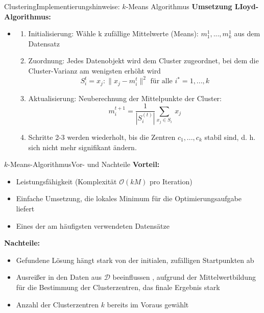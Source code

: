 \documentclass[169, handout	]{THIbeamer} %
\begin{document}
	\begin{frame}{Clustering}{Implementierungshinweise: $k$-Means Algorithmus}
		\textbf{Umsetzung LIoyd-Algorithmus:}
		\begin{itemize}
			\item 
			\begin{enumerate}
				\item Initialisierung: Wähle k zufällige Mittelwerte (Means): $m_1^{1},...,m_k^{1}$ aus dem Datensatz
				\item Zuordnung: Jedes Datenobjekt wird dem Cluster zugeordnet, bei dem die Cluster-Varianz am wenigsten erhöht wird
				\begin{equation}
					S_i^{t} = { x_j : \lVert x_j - m_i^{t} \rVert ^2 \text{ für alle } i^{*}=1, ..., k}
				\end{equation}
				\item Aktualisierung: Neuberechnung der Mittelpunkte der Cluster:
				\begin{equation}
					m_i^{t+1} = \frac{1}{|S_i^{(t)}|} \sum_{x_j \in S_i}^{}\ x_j
				\end{equation}
				\item Schritte 2-3 werden wiederholt, bis die Zentren $c_1, ..., c_k$ stabil sind, d. h. sich nicht mehr signifikant ändern.
			\end{enumerate}

		\end{itemize}
	\end{frame}
	\begin{frame}{$k$-Means-Algorithmus}{Vor- und Nachteile}
		\textbf{Vorteil:} 
		\begin{itemize}
			\item Leistungsfähigkeit (Komplexität $\mathcal{O}(kM)$ pro Iteration)
			\item Einfache Umsetzung, die lokales Minimum für die Optimierungsaufgabe liefert
			\item Eines der am häufigsten verwendeten Datensätze
		\end{itemize} 		
		\textbf{Nachteile:}		
		\begin{itemize}
			\item Gefundene Lösung hängt stark von der initialen, zufälligen Startpunkten ab
			\item Ausreißer in den Daten aus $\mathcal{D}$ beeinflussen , aufgrund der Mittelwertbildung für die Bestimmung der Clusterzentren, das finale Ergebnis stark
			\item Anzahl der Clusterzentren $k$ bereits im Voraus gewählt
		\end{itemize}
	\end{frame}
\end{document}
